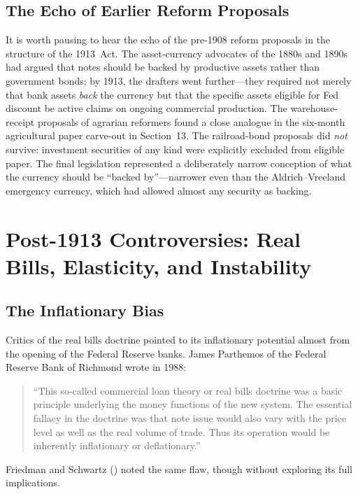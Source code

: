 \documentclass[12pt]{article}
\begin{document}
\subsection{The Echo of Earlier Reform Proposals}

It is worth pausing to hear the echo of the pre-1908 reform proposals in the
structure of the 1913~Act.  The asset-currency advocates of the 1880s and 1890s
had argued that notes should be backed by productive assets rather than government
bonds; by 1913, the drafters went further---they required not merely that bank
assets \emph{back} the currency but that the specific assets eligible for Fed
discount be active claims on ongoing commercial production.  The warehouse-receipt
proposals of agrarian reformers found a close analogue in the six-month agricultural
paper carve-out in Section~13.  The railroad-bond proposals did \emph{not} survive:
investment securities of any kind were explicitly excluded from eligible paper.
The final legislation represented a deliberately narrow conception of what the
currency should be ``backed by''---narrower even than the Aldrich--Vreeland
emergency currency, which had allowed almost any security as backing.

\section{Post-1913 Controversies: Real Bills, Elasticity, and Instability}
\label{sec:aftermath}

\subsection{The Inflationary Bias}

Critics of the real bills doctrine pointed to its inflationary potential almost
from the opening of the Federal Reserve banks.  James Parthemos of the
Federal Reserve Bank of Richmond wrote in 1988:
\begin{quote}
``This so-called commercial loan theory or real bills doctrine was a basic principle
underlying the money functions of the new system.  The essential fallacy in the
doctrine was that note issue would also vary with the price level as well as the
real volume of trade.  Thus its operation would be inherently inflationary or
deflationary.'' \citep{parthemos1988}
\end{quote}
Friedman and Schwartz (\citeyear{friedman-schwartz1963}) noted the same flaw, though
without exploring its full implications.
\end{document}
